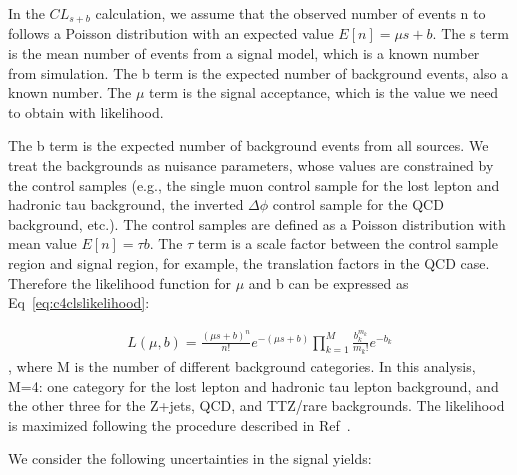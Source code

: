In the $CL_{s+b}$ calculation, we assume that the observed number of events n to follows a Poisson distribution with an expected value $E[n]=\mu s+b$. The s term is the mean number of events from a signal model, which is a known number from simulation. The b term is the expected number of background events, also a known number. The $\mu$ term is the signal acceptance, which is the value we need to obtain with likelihood. 

The b term is the expected number of background events from all sources. We treat the backgrounds as nuisance parameters, whose values are constrained by the control samples (e.g., the single muon control sample for the lost lepton and hadronic tau background, the inverted $\Delta \phi$ control sample for the QCD background, etc.). The control samples are defined as a Poisson distribution with mean value $E[n]=\tau b$. The $\tau$ term is a scale factor between the control sample region and signal region, for example, the translation factors in the QCD case. Therefore the likelihood function for $\mu$ and b can be expressed as Eq~\ref{eq:c4clslikelihood}:

\begin{equation}
 \begin{aligned}
  L(\mu,b)= \frac{(\mu s+b)^{n}}{n!}e^{-(\mu s+b)} \prod_{k=1}^{M}\frac{b_{k}^{m_{k}}}{m_{k}!}e^{-b_{k}}
 \end{aligned}
 \label{eq:c4clslikelihood}
\end{equation}
, where M is the number of different background categories. In this analysis, M=4: one category for the lost lepton and hadronic tau lepton background, and the other three for the Z+jets, QCD, and TTZ/rare backgrounds. The likelihood is maximized following the procedure described in Ref~\cite{Cowan:2010js}.

We consider the following uncertainties in the signal yields: 

